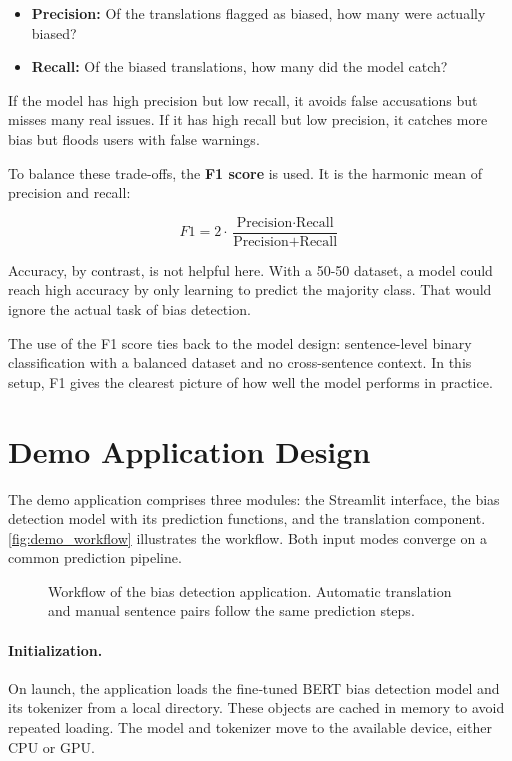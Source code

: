 \begin{itemize}
    \item \textbf{Precision:} Of the translations flagged as biased, how many were actually biased?
    \item \textbf{Recall:} Of the biased translations, how many did the model catch?
\end{itemize}

If the model has high precision but low recall, it avoids false accusations but misses many real issues. If it has high recall but low precision, it catches more bias but floods users with false warnings. 

To balance these trade-offs, the \textbf{F1 score} is used. It is the harmonic mean of precision and recall:


\[
F1 = 2 \cdot \frac{\text{Precision} \cdot \text{Recall}}{\text{Precision} + \text{Recall}}
\]
\vspace{0.5em}

Accuracy, by contrast, is not helpful here. With a 50-50 dataset, a model could reach high accuracy by only learning to predict the majority class. That would ignore the actual task of bias detection.

The use of the F1 score ties back to the model design: sentence-level binary classification with a balanced dataset and no cross-sentence context. In this setup, F1 gives the clearest picture of how well the model performs in practice.


\section{Demo Application Design}

The demo application comprises three modules: the Streamlit interface, the bias detection model with its prediction functions, and the translation component. \autoref{fig:demo_workflow} illustrates the workflow. Both input modes converge on a common prediction pipeline.

\begin{figure}[htb]
    \centering
    \scalebox{0.8}{}
    \caption{Workflow of the bias detection application. Automatic translation and manual sentence pairs follow the same prediction steps.}
    \label{fig:demo_workflow}
\end{figure}

\paragraph{Initialization.} 
On launch, the application loads the fine‑tuned BERT bias detection model and its tokenizer from a local directory. These objects are cached in memory to avoid repeated loading. The model and tokenizer move to the available device, either CPU or GPU.

